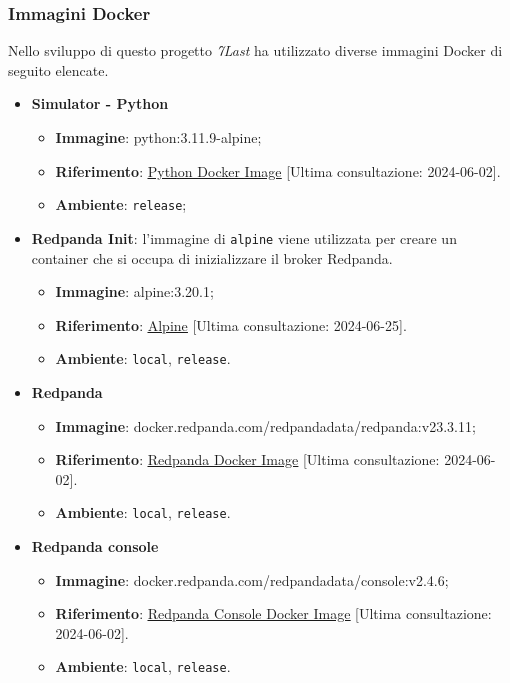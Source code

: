 \subsubsection{Immagini Docker}
Nello sviluppo di questo progetto \textit{7Last} ha utilizzato diverse immagini Docker di seguito elencate.
\begin{itemize}
	\item \textbf{Simulator - Python}
	      \begin{itemize}
		      \item \textbf{Immagine}: python:3.11.9-alpine;
		      \item \textbf{Riferimento}: \underline{\href{https://hub.docker.com/_/python}{Python Docker Image}} [Ultima consultazione: 2024-06-02].
		      \item \textbf{Ambiente}: \texttt{release};
	      \end{itemize}

	\item \textbf{Redpanda Init}:
	      l'immagine di \texttt{alpine} viene utilizzata per creare un container che si occupa di inizializzare il broker Redpanda.
	      \begin{itemize}
		      \item \textbf{Immagine}: alpine:3.20.1;
		      \item \textbf{Riferimento}: \underline{\href{https://hub.docker.com/_/alpine}{Alpine}} [Ultima consultazione: 2024-06-25].
		      \item \textbf{Ambiente}: \texttt{local}, \texttt{release}.
	      \end{itemize}

	\item \textbf{Redpanda}
	      \begin{itemize}
		      \item \textbf{Immagine}: docker.redpanda.com/redpandadata/redpanda:v23.3.11;
		      \item \textbf{Riferimento}: \underline{\href{https://hub.docker.com/r/redpandadata/redpanda}{Redpanda Docker Image}} [Ultima consultazione: 2024-06-02].
		      \item \textbf{Ambiente}: \texttt{local}, \texttt{release}.
	      \end{itemize}

	\item \textbf{Redpanda console}
	      \begin{itemize}
		      \item \textbf{Immagine}: docker.redpanda.com/redpandadata/console:v2.4.6;
		      \item \textbf{Riferimento}: \underline{\href{https://hub.docker.com/r/redpandadata/redpanda}{Redpanda Console Docker Image}} [Ultima consultazione: 2024-06-02].
		      \item \textbf{Ambiente}: \texttt{local}, \texttt{release}.
	      \end{itemize}


\end{itemize}
